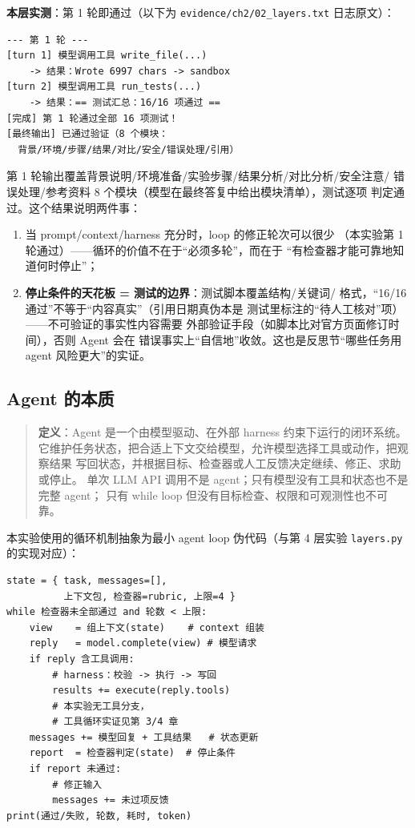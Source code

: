 \textbf{本层实测}：第 1 轮即通过（以下为
\nolinkurl{evidence/ch2/02_layers.txt} 日志原文）：

\begin{verbatim}
--- 第 1 轮 ---
[turn 1] 模型调用工具 write_file(...)
    -> 结果：Wrote 6997 chars -> sandbox
[turn 2] 模型调用工具 run_tests(...)
    -> 结果：== 测试汇总：16/16 项通过 ==
[完成] 第 1 轮通过全部 16 项测试！
[最终输出] 已通过验证（8 个模块：
  背景/环境/步骤/结果/对比/安全/错误处理/引用）
\end{verbatim}

第 1 轮输出覆盖背景说明/环境准备/实验步骤/结果分析/对比分析/安全注意/
错误处理/参考资料 8 个模块（模型在最终答复中给出模块清单），测试逐项
判定通过。这个结果说明两件事：
\begin{enumerate}[leftmargin=4em,itemsep=0pt,topsep=2pt]
    \item 当 prompt/context/harness 充分时，loop 的修正轮次可以很少
          （本实验第 1 轮通过）——循环的价值不在于``必须多轮''，而在于
          ``有检查器才能可靠地知道何时停止''；
    \item \textbf{停止条件的天花板 = 测试的边界}：测试脚本覆盖结构/关键词/
          格式，``16/16 通过''不等于``内容真实''（引用日期真伪本是
          测试里标注的``待人工核对''项）——不可验证的事实性内容需要
          外部验证手段（如脚本比对官方页面修订时间），否则 Agent 会在
          错误事实上``自信地''收敛。这也是反思节``哪些任务用 agent
          风险更大''的实证。
\end{enumerate}

\subsection{Agent 的本质}

\begin{quote}
\textbf{定义}：Agent 是一个由模型驱动、在外部 harness 约束下运行的闭环系统。
它维护任务状态，把合适上下文交给模型，允许模型选择工具或动作，把观察结果
写回状态，并根据目标、检查器或人工反馈决定继续、修正、求助或停止。
单次 LLM API 调用不是 agent；只有模型没有工具和状态也不是完整 agent；
只有 while loop 但没有目标检查、权限和可观测性也不可靠。
\end{quote}

本实验使用的循环机制抽象为最小 agent loop 伪代码（与第 4 层实验
\verb|layers.py| 的实现对应）：

\begin{verbatim}
state = { task, messages=[],
          上下文包, 检查器=rubric, 上限=4 }
while 检查器未全部通过 and 轮数 < 上限:
    view    = 组上下文(state)    # context 组装
    reply   = model.complete(view) # 模型请求
    if reply 含工具调用:
        # harness：校验 -> 执行 -> 写回
        results += execute(reply.tools)
        # 本实验无工具分支，
        # 工具循环实证见第 3/4 章
    messages += 模型回复 + 工具结果   # 状态更新
    report  = 检查器判定(state)  # 停止条件
    if report 未通过:
        # 修正输入
        messages += 未过项反馈
print(通过/失败, 轮数, 耗时, token)
\end{verbatim}

